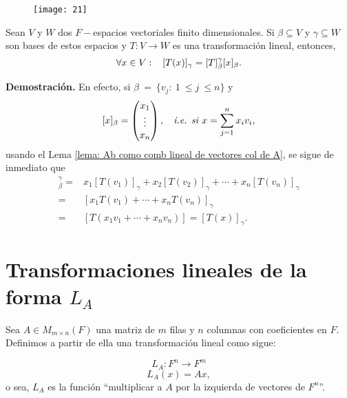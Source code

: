 \begin{figure}[H]
\centering\captionsetup{format = hang}
		\texttt{[image: 21]}
 \end{figure}
\QEDB 
\vspace{0.2cm}

\begin{teo}
	\label{teo: calculando Tx en terminos de representaciones matriciales}
Sean $V$ y $W$ dos $F-$espacios vectoriales finito dimensionales.
Si $\beta \subseteq V$ y $\gamma \subseteq W$ son bases de estos espacios
y $T: V \longrightarrow W$ es una transformación lineal, 
entonces, 
\[
\forall x \in V: \hspace{0.3cm} 
[T(x)]_{\gamma} = [T]_{\beta}^{\gamma} [x]_{\beta}.
\]
\end{teo}
\noindent
\textbf{Demostración.}
En efecto, 
si $\beta \ =\ \{v_{j} :\ 1\ \leq j\ \leq n \}$ y
\[
[x]_{\beta} = \begin{pmatrix}
x_{1} \\
\vdots \\
x_{n}
\end{pmatrix},
\hspace{0.2cm} \textit{ i.e. si }
x = \sum_{j=1}^{n} x_{i}v_{i},
\]
usando el Lema \ref{lema: Ab como comb lineal de vectores col de A},
se sigue de inmediato que 
\begin{align*}
[T]_{\beta}^{\gamma} = & 
x_{1} [T(v_{1})]_{\gamma} + x_{2} [T(v_{2})]_{\gamma} + \cdots + 
x_{n}[T(v_{n})]_{\gamma} \\
= & [x_{1}T(v_{1}) + \cdots + 
x_{n} T(v_{n})]_{\gamma} \\
= & [T(x_{1}v_{1} + \cdots + x_{n}v_{n})] = [T(x)]_{\gamma}.
\end{align*}

\QEDB
\vspace{0.2cm}

\section{Transformaciones lineales de la forma $L_{A}$}
Sea $A \in M_{m \times n} (F)$ una matriz de $m$ filas y 
$n$ columnas con coeficientes en $F$. Definimos a partir de ella
una transformación lineal como sigue:

\begin{equation}
	\label{eq: La}
L_{A} : F^{n} \longrightarrow F^{m}
\end{equation}
\[
L_{A}(x) = Ax,
\]
o sea, $L_{A}$ es la función ``multiplicar a $A$ por la izquierda
de vectores de $F^{n}$''.


